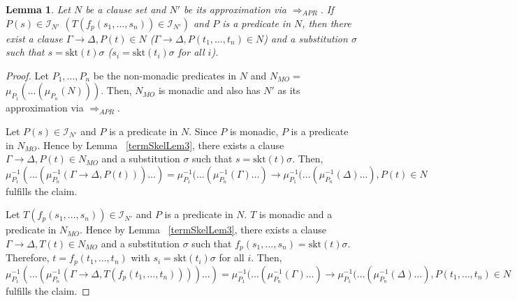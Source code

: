 \documentclass{llncs}
\newcommand{\imp}{\rightarrow}
\newcommand{\R}[1]{\mu^{-1}_{#1}}
\newcommand{\Proj}[1]{\mu_{#1}}
\newcommand{\skt}{\text{skt}}
\newcommand{\apr}{ \Rightarrow_{APR}}
\newcommand{\I}[1]{\mathcal{I}_{#1}}
\newtheorem{lem}[theorem]{Lemma}
\begin{document}
\begin{lem}\label{termSkelLem4}
Let $N$ be a clause set and $N'$ be its approximation via  $\apr$. 
If $P(s) \in \I{N'}$ $(T(f_p(s_1,\ldots,s_n))\in \I{N'})$ 
and $P$ is a predicate in $N$, then there exist a clause 
$\Gamma \imp \Delta,P(t) \in N$  ($\Gamma \imp \Delta,P(t_1,\ldots,t_n) \in N$)
and a substitution $\sigma$ such that
$s = \skt(t)\sigma$ ($s_i = \skt(t_i)\sigma$ for all $i$).
\end{lem}


\begin{proof}
Let $P_1,\ldots,P_n$ be the non-monadic predicates in $N$ and $N_{MO}=$ $\Proj{P_1}(\ldots(\Proj{P_n}(N)))$.
Then, $N_{MO}$ is monadic and also has $N'$ as its approximation via $\apr$.

 Let $P(s) \in \I{N'}$ and $P$ is a predicate in $N$. Since $P$ is monadic, $P$ is a predicate in $N_{MO}$.
Hence by Lemma ~\ref{termSkelLem3}, there exists a clause $\Gamma \imp \Delta,P(t) \in N_{MO}$ 
and a substitution $\sigma$ such that $s = \skt(t)\sigma$. 
Then, $\R{P_1}(\ldots(\R{P_n}(\Gamma \imp \Delta,P(t)))\ldots)= \R{P_1}(\ldots(\R{P_n}(\Gamma)\ldots) \imp \R{P_1}(\ldots(\R{P_n}(\Delta)\ldots),P(t)\in N$ fulfills the claim.

Let $T(f_p(s_1,\ldots,s_n))\in \I{N'}$ and $P$ is a predicate in $N$. $T$ is monadic and a predicate in $N_{MO}$.
Hence by Lemma ~\ref{termSkelLem3}, there exists a clause $\Gamma \imp \Delta,T(t) \in N_{MO}$ 
and a substitution $\sigma$ such that $f_p(s_1,\ldots,s_n) = \skt(t)\sigma$.
Therefore, $t=f_p(t_1,\ldots,t_n)$ with  $s_i = \skt(t_i)\sigma$ for all $i$.
Then, $\R{P_1}(\ldots(\R{P_n}(\Gamma \imp \Delta,T(f_p(t_1,\ldots,t_n))))\ldots)=\R{P_1}(\ldots(\R{P_n}(\Gamma)\ldots) \imp \R{P_1}(\ldots(\R{P_n}(\Delta)\ldots),P(t_1,\ldots,t_n) \in N$ fulfills the claim.
\end{proof}

 
\end{document}
